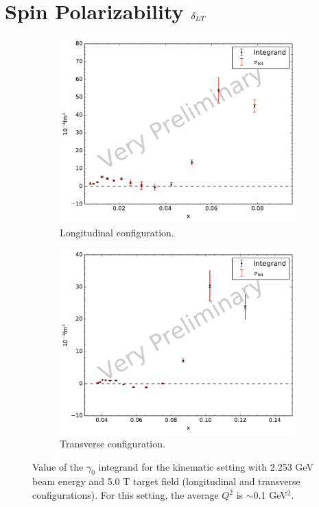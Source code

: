 \section{\texorpdfstring{Spin Polarizability $\delta_{LT}$}{Spin Polarizability delta\_\{LT\}}}
\label{C8S5}

\begin{figure}[p!]
  \centering
  \begin{subfigure}[t]{0.79\textwidth}
    \includegraphics[width=\textwidth]{figs/gamma0-model-22535000.pdf}
    \caption{Longitudinal configuration. \label{C8S5F1a}}
  \end{subfigure}
  \begin{subfigure}[t]{0.79\textwidth}
    \includegraphics[width=\textwidth]{figs/gamma0-model-22535090.pdf}
    \caption{Transverse configuration. \label{C8S5F1b}}
  \end{subfigure}
  \caption[$\gamma_0$ integrand with $E=2.253$ GeV and $B=5.0$ T.]{Value of the $\gamma_0$ integrand for the kinematic setting with 2.253 GeV beam energy and 5.0 T target field (longitudinal and transverse configurations). For this setting, the average $Q^2$ is $\sim$0.1 GeV${}^2$. \label{C8S5F1}}
\end{figure}

